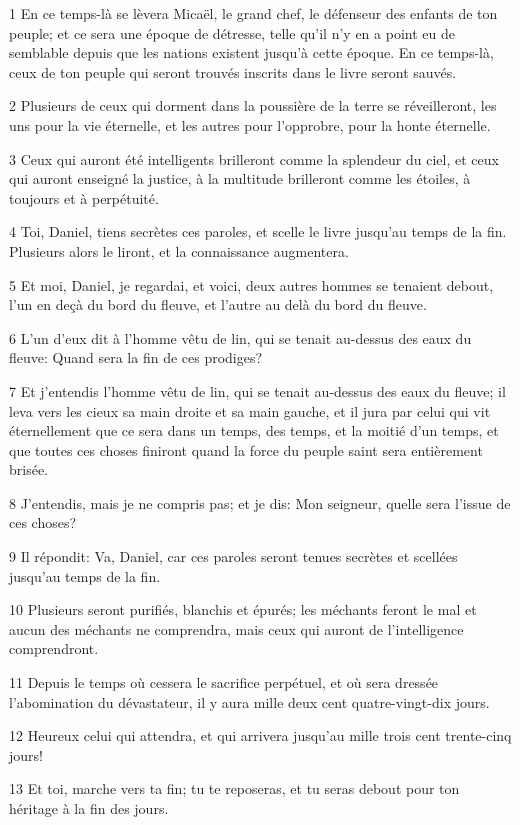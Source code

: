 \par 1 En ce temps-là se lèvera Micaël, le grand chef, le défenseur des enfants de ton peuple; et ce sera une époque de détresse, telle qu'il n'y en a point eu de semblable depuis que les nations existent jusqu'à cette époque. En ce temps-là, ceux de ton peuple qui seront trouvés inscrits dans le livre seront sauvés.
\par 2 Plusieurs de ceux qui dorment dans la poussière de la terre se réveilleront, les uns pour la vie éternelle, et les autres pour l'opprobre, pour la honte éternelle.
\par 3 Ceux qui auront été intelligents brilleront comme la splendeur du ciel, et ceux qui auront enseigné la justice, à la multitude brilleront comme les étoiles, à toujours et à perpétuité.
\par 4 Toi, Daniel, tiens secrètes ces paroles, et scelle le livre jusqu'au temps de la fin. Plusieurs alors le liront, et la connaissance augmentera.
\par 5 Et moi, Daniel, je regardai, et voici, deux autres hommes se tenaient debout, l'un en deçà du bord du fleuve, et l'autre au delà du bord du fleuve.
\par 6 L'un d'eux dit à l'homme vêtu de lin, qui se tenait au-dessus des eaux du fleuve: Quand sera la fin de ces prodiges?
\par 7 Et j'entendis l'homme vêtu de lin, qui se tenait au-dessus des eaux du fleuve; il leva vers les cieux sa main droite et sa main gauche, et il jura par celui qui vit éternellement que ce sera dans un temps, des temps, et la moitié d'un temps, et que toutes ces choses finiront quand la force du peuple saint sera entièrement brisée.
\par 8 J'entendis, mais je ne compris pas; et je dis: Mon seigneur, quelle sera l'issue de ces choses?
\par 9 Il répondit: Va, Daniel, car ces paroles seront tenues secrètes et scellées jusqu'au temps de la fin.
\par 10 Plusieurs seront purifiés, blanchis et épurés; les méchants feront le mal et aucun des méchants ne comprendra, mais ceux qui auront de l'intelligence comprendront.
\par 11 Depuis le temps où cessera le sacrifice perpétuel, et où sera dressée l'abomination du dévastateur, il y aura mille deux cent quatre-vingt-dix jours.
\par 12 Heureux celui qui attendra, et qui arrivera jusqu'au mille trois cent trente-cinq jours!
\par 13 Et toi, marche vers ta fin; tu te reposeras, et tu seras debout pour ton héritage à la fin des jours.


